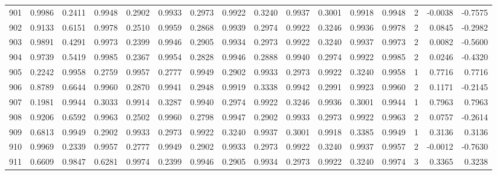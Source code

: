 \begin{tabular}{lrrrrrrrrrrrrrrr}
901 &      0.9986 &  0.2411 &  0.9948 &  0.2902 &  0.9933 &  0.2973 &  0.9922 &  0.3240 &  0.9937 &  0.3001 &   0.9918 &     0.9948 &      2 &                   -0.0038 &                    -0.7575 \\
902 &      0.9133 &  0.6151 &  0.9978 &  0.2510 &  0.9959 &  0.2868 &  0.9939 &  0.2974 &  0.9922 &  0.3246 &   0.9936 &     0.9978 &      2 &                    0.0845 &                    -0.2982 \\
903 &      0.9891 &  0.4291 &  0.9973 &  0.2399 &  0.9946 &  0.2905 &  0.9934 &  0.2973 &  0.9922 &  0.3240 &   0.9937 &     0.9973 &      2 &                    0.0082 &                    -0.5600 \\
904 &      0.9739 &  0.5419 &  0.9985 &  0.2367 &  0.9954 &  0.2828 &  0.9946 &  0.2888 &  0.9940 &  0.2974 &   0.9922 &     0.9985 &      2 &                    0.0246 &                    -0.4320 \\
905 &      0.2242 &  0.9958 &  0.2759 &  0.9957 &  0.2777 &  0.9949 &  0.2902 &  0.9933 &  0.2973 &  0.9922 &   0.3240 &     0.9958 &      1 &                    0.7716 &                     0.7716 \\
906 &      0.8789 &  0.6644 &  0.9960 &  0.2870 &  0.9941 &  0.2948 &  0.9919 &  0.3338 &  0.9942 &  0.2991 &   0.9923 &     0.9960 &      2 &                    0.1171 &                    -0.2145 \\
907 &      0.1981 &  0.9944 &  0.3033 &  0.9914 &  0.3287 &  0.9940 &  0.2974 &  0.9922 &  0.3246 &  0.9936 &   0.3001 &     0.9944 &      1 &                    0.7963 &                     0.7963 \\
908 &      0.9206 &  0.6592 &  0.9963 &  0.2502 &  0.9960 &  0.2798 &  0.9947 &  0.2902 &  0.9933 &  0.2973 &   0.9922 &     0.9963 &      2 &                    0.0757 &                    -0.2614 \\
909 &      0.6813 &  0.9949 &  0.2902 &  0.9933 &  0.2973 &  0.9922 &  0.3240 &  0.9937 &  0.3001 &  0.9918 &   0.3385 &     0.9949 &      1 &                    0.3136 &                     0.3136 \\
910 &      0.9969 &  0.2339 &  0.9957 &  0.2777 &  0.9949 &  0.2902 &  0.9933 &  0.2973 &  0.9922 &  0.3240 &   0.9937 &     0.9957 &      2 &                   -0.0012 &                    -0.7630 \\
911 &      0.6609 &  0.9847 &  0.6281 &  0.9974 &  0.2399 &  0.9946 &  0.2905 &  0.9934 &  0.2973 &  0.9922 &   0.3240 &     0.9974 &      3 &                    0.3365 &                     0.3238 \\

\end{tabular}
